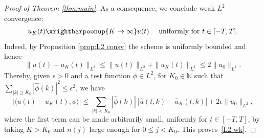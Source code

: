 \documentclass [11pt] {article}
\newcommand{\<}{\langle}
\renewcommand{\>}{\rangle}
\begin{document}
\begin{proof}[Proof of Theorem \ref{thm:main}]
As a consequence, 
we conclude weak $L^2$ convergence:
\begin{equation}
u_{K}(t) \xrightharpoonup{K\to\infty}
u(t) \quad\text{ uniformly for }t\in [-T,T] .
\label{L2 wk}
\end{equation}
Indeed, by Proposition \ref{prop:L2 consv} the scheme is uniformly bounded and hence
\[
\|u(t) - u_K(t) \|_{L^2} \le \|u(t) \|_{L^2} + \| u_K(t)\|_{L^2} \le 2 \| u_0\|_{L^2}.
\]
Thereby, given $\epsilon > 0$ and a test function $\phi\in L^2$, for $ K_0 \in \mathbb{N}$ such that $ \sum_{|k|\ge K_0} |\widehat\phi(k)|^2 \le \epsilon^2$, we have
\[
|\langle u(t) - u_K(t), \phi\rangle| \le \sum_{|k|< K_0} |\widehat{\phi}(k)| \ |\widehat{u}(t,k) - \widehat{u}_{K}(t,k)| + 2\epsilon \| u_0\|_{L^2},
\]
where the first term can be made arbitrarily small, uniformly for $t\in [-T,T]$, by taking $K > K_0$ and $n(j)$ large enough for $0\le j< K_0$. This proves~\eqref{L2 wk}.


\end{proof}
\end{document}
